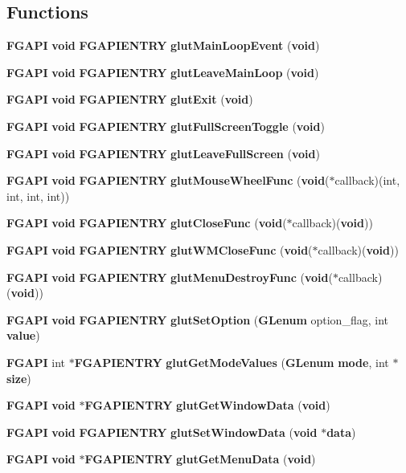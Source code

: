 \subsection*{Functions}
\begin{DoxyCompactItemize}
\item 
{\bf F\+G\+A\+P\+I} {\bf void} {\bf F\+G\+A\+P\+I\+E\+N\+T\+R\+Y} {\bf glut\+Main\+Loop\+Event} ({\bf void})
\item 
{\bf F\+G\+A\+P\+I} {\bf void} {\bf F\+G\+A\+P\+I\+E\+N\+T\+R\+Y} {\bf glut\+Leave\+Main\+Loop} ({\bf void})
\item 
{\bf F\+G\+A\+P\+I} {\bf void} {\bf F\+G\+A\+P\+I\+E\+N\+T\+R\+Y} {\bf glut\+Exit} ({\bf void})
\item 
{\bf F\+G\+A\+P\+I} {\bf void} {\bf F\+G\+A\+P\+I\+E\+N\+T\+R\+Y} {\bf glut\+Full\+Screen\+Toggle} ({\bf void})
\item 
{\bf F\+G\+A\+P\+I} {\bf void} {\bf F\+G\+A\+P\+I\+E\+N\+T\+R\+Y} {\bf glut\+Leave\+Full\+Screen} ({\bf void})
\item 
{\bf F\+G\+A\+P\+I} {\bf void} {\bf F\+G\+A\+P\+I\+E\+N\+T\+R\+Y} {\bf glut\+Mouse\+Wheel\+Func} ({\bf void}($\ast$callback)(int, int, int, int))
\item 
{\bf F\+G\+A\+P\+I} {\bf void} {\bf F\+G\+A\+P\+I\+E\+N\+T\+R\+Y} {\bf glut\+Close\+Func} ({\bf void}($\ast$callback)({\bf void}))
\item 
{\bf F\+G\+A\+P\+I} {\bf void} {\bf F\+G\+A\+P\+I\+E\+N\+T\+R\+Y} {\bf glut\+W\+M\+Close\+Func} ({\bf void}($\ast$callback)({\bf void}))
\item 
{\bf F\+G\+A\+P\+I} {\bf void} {\bf F\+G\+A\+P\+I\+E\+N\+T\+R\+Y} {\bf glut\+Menu\+Destroy\+Func} ({\bf void}($\ast$callback)({\bf void}))
\item 
{\bf F\+G\+A\+P\+I} {\bf void} {\bf F\+G\+A\+P\+I\+E\+N\+T\+R\+Y} {\bf glut\+Set\+Option} ({\bf G\+Lenum} option\+\_\+flag, int {\bf value})
\item 
{\bf F\+G\+A\+P\+I} int $\ast${\bf F\+G\+A\+P\+I\+E\+N\+T\+R\+Y} {\bf glut\+Get\+Mode\+Values} ({\bf G\+Lenum} {\bf mode}, int $\ast${\bf size})
\item 
{\bf F\+G\+A\+P\+I} {\bf void} $\ast${\bf F\+G\+A\+P\+I\+E\+N\+T\+R\+Y} {\bf glut\+Get\+Window\+Data} ({\bf void})
\item 
{\bf F\+G\+A\+P\+I} {\bf void} {\bf F\+G\+A\+P\+I\+E\+N\+T\+R\+Y} {\bf glut\+Set\+Window\+Data} ({\bf void} $\ast${\bf data})
\item 
{\bf F\+G\+A\+P\+I} {\bf void} $\ast${\bf F\+G\+A\+P\+I\+E\+N\+T\+R\+Y} {\bf glut\+Get\+Menu\+Data} ({\bf void})

\end{DoxyCompactItemize}
